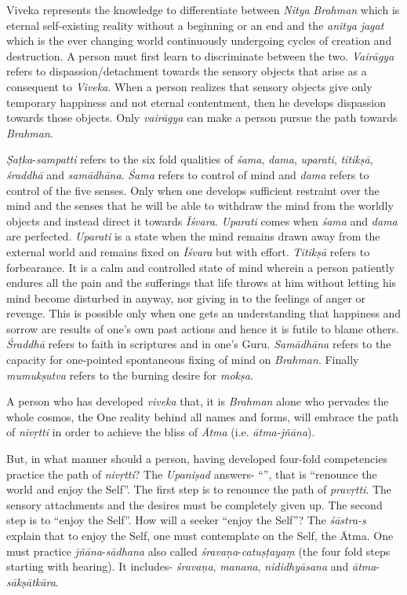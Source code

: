 Viveka represents the knowledge to differentiate between \emph{Nitya} \emph{Brahman} which is eternal self-existing reality without a beginning or an end and the \emph{anitya} \emph{jagat} which is the ever changing world continuously undergoing cycles of creation and destruction. A person must first learn to discriminate between the two. \emph{Vairāgya} refers to dispassion/detachment towards the sensory objects that arise as a consequent to \emph{Viveka}. When a person realizes that sensory objects give only temporary happiness and not eternal contentment, then he develops dispassion towards those objects. Only \emph{vairāgya} can make a person pursue the path towards \emph{Brahman}.

\emph{Ṣaṭka}-\emph{sampatti} refers to the six fold qualities of \emph{śama}, \emph{dama}, \emph{uparati}, \emph{titikṣā}, \emph{śraddhā} and \emph{samādhāna}. \emph{Śama} refers to control of mind and \emph{dama} refers to control of the five senses. Only when one develops sufficient restraint over the mind and the senses that he will be able to withdraw the mind from the worldly objects and instead direct it towards \emph{Īśvara}. \emph{Uparati} comes when \emph{śama} and \emph{dama} are perfected. \emph{Uparati} is a state when the mind remains drawn away from the external world and remains fixed on \emph{Īśvara} but with effort. \emph{Titikṣā} refers to forbearance. It is a calm and controlled state of mind wherein a person patiently endures all the pain and the sufferings that life throws at him without letting his mind become disturbed in anyway, nor giving in to the feelings of anger or revenge. This is possible only when one gets an understanding that happiness and sorrow are results of one's own past actions and hence it is futile to blame others. \emph{Śraddhā} refers to faith in scriptures and in one's Guru. \emph{Samādhāna} refers to the capacity for one-pointed spontaneous fixing of mind on \emph{Brahman}. Finally \emph{mumukṣutva} refers to the burning desire for \emph{mokṣa}.

A person who has developed \emph{viveka} that, it is \emph{Brahman} alone who pervades the whole cosmos, the One reality behind all names and forms, will embrace the path of \emph{nivṛtti} in order to achieve the bliss of \emph{Ātma} (i.e. \emph{ātma-jñāna}).

But, in what manner should a person, having developed four-fold competencies practice the path of \emph{nivṛtti}? The \emph{Upaniṣad} answers- ``'', that is ``renounce the world and enjoy the Self''. The first step is to renounce the path of \emph{pravṛtti}. The sensory attachments and the desires must be completely given up. The second step is to ``enjoy the Self''. How will a seeker ``enjoy the Self''? The \emph{śāstra-s} explain that to enjoy the Self, one must contemplate on the Self, the Ātma. One must practice \emph{jñāna}-\emph{sādhana} also called \emph{śravaṇa}-\emph{catuṣṭayaṃ} (the four fold steps starting with hearing). It includes- \emph{śravaṇa}, \emph{manana}, \emph{nididhyāsana} and \emph{ātma}-\emph{sākṣātkāra}.

